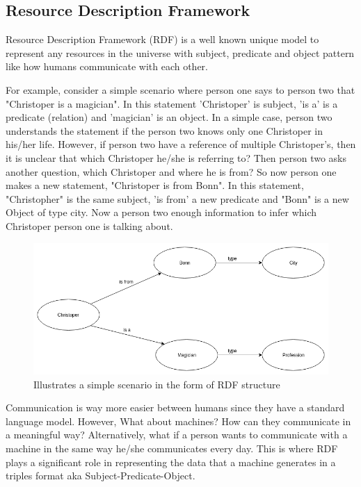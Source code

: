 	\subsection{Resource Description Framework}

	Resource Description Framework (RDF) is a well known unique model to represent any resources in the universe with subject, predicate and object pattern like how humans communicate with each other.
	
	For example, consider a simple scenario where person one says to person two that "Christoper is a magician". In this statement 'Christoper' is subject, 'is a' is a predicate (relation) and 'magician' is an object. In a simple case, person two understands the statement if the person two knows only one Christoper in his/her life. However, if person two have a reference of multiple Christoper's, then it is unclear that which Christoper he/she is referring to? Then person two asks another question, which Christoper and where he is from? So now person one makes a new statement, "Christoper is from Bonn". In this statement, "Christopher" is the same subject, 'is from' a new predicate and "Bonn" is a new Object of type city. Now a person two enough information to infer which Christoper person one is talking about.
	
	\begin{figure}[!htbp] 
		\begin{center}
			\includegraphics[scale=0.5]{./images/png/rdf/uml_example}	
			\caption{Illustrates a simple scenario in the form of RDF structure}	
			\label{fig:uml_example}	
		\end{center}
	\end{figure}

	Communication is way more easier between humans since they have a standard language model. However, What about machines? How can they communicate in a meaningful way? Alternatively, what if a person wants to communicate with a machine in the same way he/she communicates every day. This is where RDF plays a significant role in representing the data that a machine generates in a triples format aka Subject-Predicate-Object.
	
